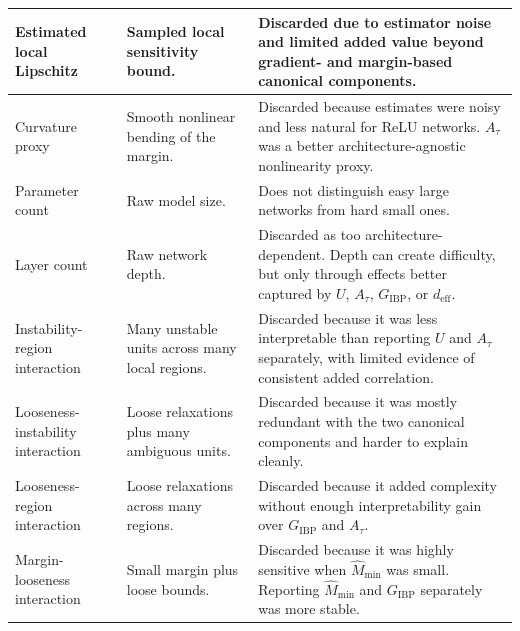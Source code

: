 \documentclass{article}
\theoremstyle{definition}
\begin{document}
\begin{table}[h]
\begin{tabularx}{\textwidth}{
@{}
>{\raggedright\arraybackslash}p{}
>{\raggedright\arraybackslash}p{}
>{\raggedright\arraybackslash}X
@{}}
Estimated local Lipschitz
& Sampled local sensitivity bound.
& Discarded due to estimator noise and limited added value beyond gradient- and margin-based canonical components. \\
\hline

Curvature proxy
& Smooth nonlinear bending of the margin.
& Discarded because estimates were noisy and less natural for ReLU networks. $A_\tau$ was a better architecture-agnostic nonlinearity proxy. \\
\hline

Parameter count
& Raw model size.
& Does not distinguish easy large networks from hard small ones. \\
\hline

Layer count
& Raw network depth.
& Discarded as too architecture-dependent. Depth can create difficulty, but only through effects better captured by $U$, $A_\tau$, $G_{\mathrm{IBP}}$, or $d_{\mathrm{eff}}$. \\
\hline

Instability-region interaction
& Many unstable units across many local regions.
& Discarded because it was less interpretable than reporting $U$ and $A_\tau$ separately, with limited evidence of consistent added correlation. \\
\hline

Looseness-instability interaction
& Loose relaxations plus many ambiguous units.
& Discarded because it was mostly redundant with the two canonical components and harder to explain cleanly. \\
\hline

Looseness-region interaction
& Loose relaxations across many regions.
& Discarded because it added complexity without enough interpretability gain over $G_{\mathrm{IBP}}$ and $A_\tau$. \\
\hline

Margin-looseness interaction
& Small margin plus loose bounds.
& Discarded because it was highly sensitive when $\widehat M_{\min}$ was small. Reporting $\widehat M_{\min}$ and $G_{\mathrm{IBP}}$ separately was more stable. \\
\hline

\end{tabularx}
\label{tab:discarded_difficulty_components}
\end{table}
\end{document}

